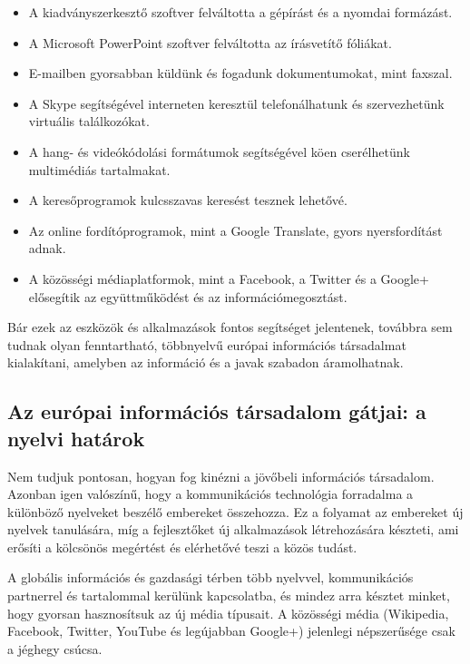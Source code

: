 \begin{multicols}{2}
\begin{itemize}
\item A kiadványszerkesztő szoftver felváltotta a gépírást és a nyomdai formázást.
\item A Microsoft PowerPoint szoftver felváltotta az írásvetítő fóliákat.
\item E-mailben gyorsabban küldünk és fogadunk dokumentumokat, mint faxszal.
\item A Skype segítségével interneten ke\-resz\-tül telefonálhatunk és szer\-vez\-he\-tünk virtuális találkozókat.
\item A hang- és videókódolási formátumok segítségével köen cserélhetünk multimédiás tartalmakat.
\item A keresőprogramok kulcsszavas ke\-re\-sést tesznek lehetővé.
\item Az online fordítóprogramok, mint a Google Translate, gyors nyersfordítást adnak.
\item A közösségi médiaplatformok, mint a Facebook, a Twitter és a Google+ elősegítik az együttműködést és az információmegosztást.
\end{itemize}

Bár ezek az eszközök és alkalmazások fontos segítséget jelentenek, továbbra sem tudnak olyan fenntartható, többnyelvű európai információs társadalmat kialakítani, amelyben az információ és a javak szabadon áramolhatnak.

\subsection{Az európai információs társadalom gátjai: a nyelvi határok}

Nem tudjuk pontosan, hogyan fog kinézni a jövőbeli információs társadalom. Azonban igen valószínű, hogy a kommunikációs technológia forradalma a különböző nyelveket beszélő embereket összehozza. Ez a folyamat az embereket új nyelvek tanulására, míg a fejlesztőket új alkalmazások létrehozására készteti, ami erő\-sí\-ti a kölcsönös megértést és elérhetővé teszi a közös tudást. 


A globális információs és gazdasági térben több nyelvvel, kommunikációs partnerrel és tartalommal kerülünk kapcsolatba, és mindez arra késztet minket, hogy gyorsan hasznosítsuk az új média típusait. A közösségi média (Wikipedia, Facebook, Twitter, YouTube és legújabban Google+) jelenlegi népszerűsége csak a jéghegy csúcsa. 


\end{multicols}
